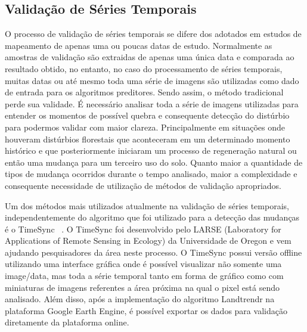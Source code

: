 \documentclass[twocolumn]{article}
\begin{document}
\subsection{Validação de Séries Temporais}
O processo de validação de séries temporais se difere dos adotados em estudos de mapeamento de apenas uma ou poucas datas de estudo. Normalmente as amostras de validação são extraidas de apenas uma única data e comparada ao resultado obtido, no entanto, no caso do processamento de séries temporais, muitas datas ou até mesmo toda uma série de imagens são utilizadas como dado de entrada para os algoritmos preditores. Sendo assim, o método tradicional perde sua validade. É necessário analisar toda a série de imagens utilizadas para entender os momentos de possível quebra e consequente detecção do distúrbio para podermos validar com maior clareza. Principalmente em situações onde houveram distúrbios florestais que aconteceram em um determinado momento histórico e que posteriormente iniciaram um processo de regeneração natural ou então uma mudança para um terceiro uso do solo. Quanto maior a quantidade de tipos de mudança ocorridos durante o tempo analisado, maior a complexidade e consequente necessidade de utilização de métodos de validação apropriados. 
\par
Um dos métodos mais utilizados atualmente na validação de séries temporais, independentemente do algoritmo que foi utilizado para a detecção das mudanças é o TimeSync ~\cite{COHEN20102911}. O TimeSync foi desenvolvido pelo LARSE (Laboratory for Applications of Remote Sensing in Ecology) da Universidade de Oregon e vem ajudando pesquisadores da área neste processo. O TimeSync possui versão offline utilizando uma interface gráfica onde é possível visualizar não somente uma image/data, mas toda a série temporal tanto em forma de gráfico como com miniaturas de imagens referentes a área próxima na qual o pixel está sendo analisado. Além disso, após a implementação do algoritmo Landtrendr na plataforma Google Earth Engine, é possível exportar os dados para validação diretamente da plataforma online. 
\end{document}
